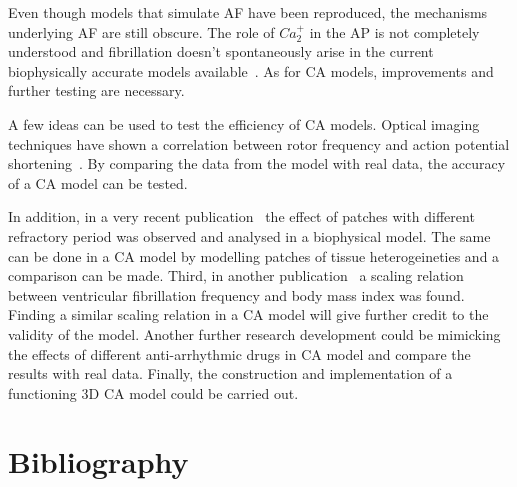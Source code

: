\documentclass{article}
\begin{document}
Even though models that simulate AF have been reproduced, the mechanisms underlying AF are still obscure. The role of $Ca_{2}^{+}$ in the AP is not completely understood and fibrillation doesn't spontaneously arise in the current biophysically accurate models available~\cite{arrhythmia_ca2016}\cite{arrhythmia_careview2016}. As for CA models, improvements and further testing are necessary.

A few ideas can be used to test the efficiency of CA models. Optical imaging techniques have shown a correlation between rotor frequency and action potential shortening~\cite{physmodel_rotorspeed2015}. By comparing the data from the model with real data, the accuracy of a CA model can be tested. 

In addition, in a very recent publication~\cite{physmodel_heterogeneities2015} the effect of patches with different refractory period was observed and analysed in a biophysical model. The same can be done in a CA model by modelling patches of tissue heterogeineties and a comparison can be made. Third, in another publication~\cite{arrhythmia_rotorsreview2013} a scaling relation between ventricular fibrillation frequency and body mass index was found. Finding a similar scaling relation in a CA model will give further credit to the validity of the model. Another further research development could be mimicking the effects of different anti-arrhythmic drugs in CA model and  compare the results with real data. Finally, the construction and implementation of a functioning 3D CA model could be carried out.
 
 
 \newpage
 


\section{Bibliography}



\end{document}
